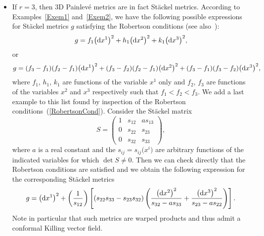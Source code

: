 \documentclass[pdftex]{sigma}
\numberwithin{equation}{section}
\begin{document}
\begin{itemize}
\item If $r=3$, then 3D Painlev\'e metrics are in fact St\"ackel metrics. According to Examp\-les~\ref{Exem1} and~\ref{Exem2}, we have the following possible expressions for St\"ackel metrics $g$ satisfying the Robertson conditions (see also~\cite{Gob2016}):
\begin{gather*} %
 g = f_1 \big({\rm d}x^1\big)^2 + h_1 \big({\rm d}x^2\big)^2 + k_1 \big({\rm d}x^3\big)^2,
\end{gather*}
or
\begin{gather*} %
 g = (f_3 - f_1)(f_2-f_1) \big({\rm d}x^1\big)^2 + (f_3-f_2)(f_2-f_1) \big({\rm d}x^2\big)^2 + (f_3-f_1)(f_3-f_2) \big({\rm d}x^3\big)^2,
\end{gather*}
where $f_1$, $h_1$, $k_1$ are functions of the variable $x^1$ only and $f_2$, $f_3$ are functions of the variables $x^2$ and $x^3$ respectively such that $f_1 < f_2 < f_3$. We add a last example to this list found by inspection of the Robertson conditions~(\ref{RobertsonCond}). Consider the St\"ackel matrix
\[
S=\left( \begin{matrix}
1&s_{12}&a s_{13}\\
0&s_{22}&s_{23} \\
0&s_{32}&s_{33}
\end{matrix} \right),
\]
where $a$ is a real constant and the $s_{ij}=s_{ij}\big(x^i\big)$ are arbitrary functions of the indicated variables for which $\det S \neq 0$. Then we can check directly that the Robertson conditions are satisfied and we obtain the following expression for the corresponding St\"ackel metrics
\begin{gather} \label{Painleve3D-4}
 g = \big({\rm d}x^1\big)^2 + \left( \frac{1}{s_{12}} \right) \left[ (s_{22}s_{33} - s_{23}s_{32}) \left( \frac{\big({\rm d}x^2\big)^2}{s_{32}-as_{33}} + \frac{\big({\rm d}x^3\big)^2}{s_{23}-as_{22}} \right) \right].
\end{gather}
Note in particular that such metrics are warped products and thus admit a conformal Killing vector field.
\end{itemize}
\end{document}

